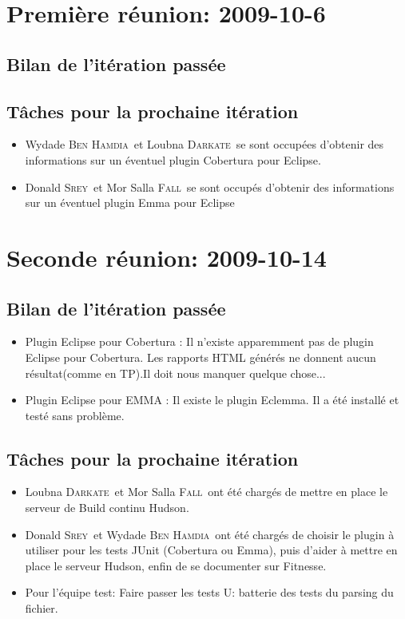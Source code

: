 \documentclass[a4paper,12pt]{article}
\def\familyname{\textsc}
\def\firstname#1{#1}
\def\groupmember#1#2{\firstname{#1} \familyname{#2}}
\def\mwyd{\groupmember{Wydade}{Ben Hamdia}}
\def\mlou{\groupmember{Loubna}{Darkate}}
\def\mmor{\groupmember{Mor Salla}{Fall}}
\def\mdon{\groupmember{Donald}{Srey}}
\begin{document}
\section{Première réunion: 2009-10-6}

\subsection{Bilan de l'itération passée}

\subsection{Tâches pour la prochaine itération}

\begin{itemize}
 \item \mwyd\ et \mlou\ se sont occupées d'obtenir des informations sur un éventuel plugin Cobertura pour Eclipse.
 \item \mdon\ et \mmor\ se sont occupés d'obtenir des informations sur un éventuel plugin Emma pour Eclipse
\end{itemize}



\section{Seconde réunion: 2009-10-14}

\subsection{Bilan de l'itération passée}
\begin{itemize}
 \item Plugin Eclipse pour Cobertura :
 Il n'existe apparemment pas de plugin Eclipse pour Cobertura. Les rapports HTML générés ne donnent aucun résultat(comme en TP).Il doit nous manquer quelque chose...

\item Plugin Eclipse pour EMMA :
 Il existe le plugin Eclemma. Il a été installé et testé sans problème.
\end{itemize}

\subsection{Tâches pour la prochaine itération}

\begin{itemize}
 \item \mlou\ et \mmor\ ont été chargés de mettre en place le serveur de Build continu Hudson.
 \item \mdon\ et \mwyd\ ont été chargés de choisir le plugin à utiliser pour les tests JUnit (Cobertura ou Emma), puis d'aider à mettre en place le serveur Hudson, enfin de se documenter sur Fitnesse.
 \item Pour l'équipe test: Faire passer les tests U: batterie des tests du parsing du fichier.

\end{itemize}
\end{document}

